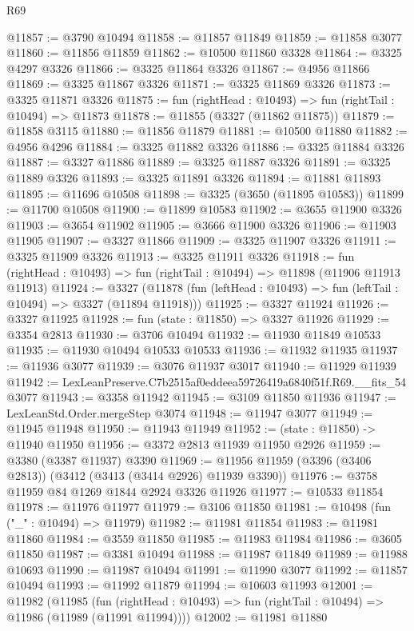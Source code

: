 \begin{lexlean}{R69}
\begin{coremodule}
@11857 := @3790 @10494
@11858 := @11857 @11849
@11859 := @11858 @3077
@11860 := @11856 @11859
@11862 := @10500 @11860 @3328
@11864 := @3325 @4297 @3326
@11866 := @3325 @11864 @3326
@11867 := @4956 @11866
@11869 := @3325 @11867 @3326
@11871 := @3325 @11869 @3326
@11873 := @3325 @11871 @3326
@11875 := fun (rightHead : @10493) => fun (rightTail : @10494) => @11873
@11878 := @11855 (@3327 (@11862 @11875))
@11879 := @11858 @3115
@11880 := @11856 @11879
@11881 := @10500 @11880
@11882 := @4956 @4296
@11884 := @3325 @11882 @3326
@11886 := @3325 @11884 @3326
@11887 := @3327 @11886
@11889 := @3325 @11887 @3326
@11891 := @3325 @11889 @3326
@11893 := @3325 @11891 @3326
@11894 := @11881 @11893
@11895 := @11696 @10508
@11898 := @3325 (@3650 (@11895 @10583))
@11899 := @11700 @10508
@11900 := @11899 @10583
@11902 := @3655 @11900 @3326
@11903 := @3654 @11902
@11905 := @3666 @11900 @3326
@11906 := @11903 @11905
@11907 := @3327 @11866
@11909 := @3325 @11907 @3326
@11911 := @3325 @11909 @3326
@11913 := @3325 @11911 @3326
@11918 := fun (rightHead : @10493) => fun (rightTail : @10494) => @11898 (@11906 @11913 @11913)
@11924 := @3327
    (@11878 (fun (leftHead : @10493) => fun (leftTail : @10494) => @3327 (@11894 @11918)))
@11925 := @3327 @11924
@11926 := @3327 @11925
@11928 := fun (state : @11850) => @3327 @11926
@11929 := @3354 @2813
@11930 := @3706 @10494
@11932 := @11930 @11849 @10533
@11935 := @11930 @10494 @10533 @10533
@11936 := @11932 @11935
@11937 := @11936 @3077
@11939 := @3076 @11937 @3017
@11940 := @11929 @11939
@11942 := LexLeanPreserve.C7b2515af0eddeea59726419a6840f51f.R69.__fits_54 @3077
@11943 := @3358 @11942
@11945 := @3109 @11850 @11936
@11947 := LexLeanStd.Order.mergeStep @3074
@11948 := @11947 @3077
@11949 := @11945 @11948
@11950 := @11943 @11949
@11952 := (state : @11850) -> @11940 @11950
@11956 := @3372 @2813 @11939 @11950 @2926
@11959 := @3380 (@3387 @11937) @3390
@11969 := @11956 @11959 (@3396 (@3406 @2813)) (@3412 (@3413 (@3414 @2926) @11939 @3390))
@11976 := @3758 @11959 @84 @1269 @1844 @2924 @3326 @11926
@11977 := @10533 @11854
@11978 := @11976 @11977
@11979 := @3106 @11850
@11981 := @10498 (fun ("_" : @10494) => @11979)
@11982 := @11981 @11854
@11983 := @11981 @11860
@11984 := @3559 @11850
@11985 := @11983 @11984
@11986 := @3605 @11850
@11987 := @3381 @10494
@11988 := @11987 @11849
@11989 := @11988 @10693
@11990 := @11987 @10494
@11991 := @11990 @3077
@11992 := @11857 @10494
@11993 := @11992 @11879
@11994 := @10603 @11993
@12001 := @11982
    (@11985
      (fun (rightHead : @10493) => fun (rightTail : @10494) => @11986 (@11989 (@11991 @11994))))
@12002 := @11981 @11880

\end{coremodule}
\end{lexlean}
